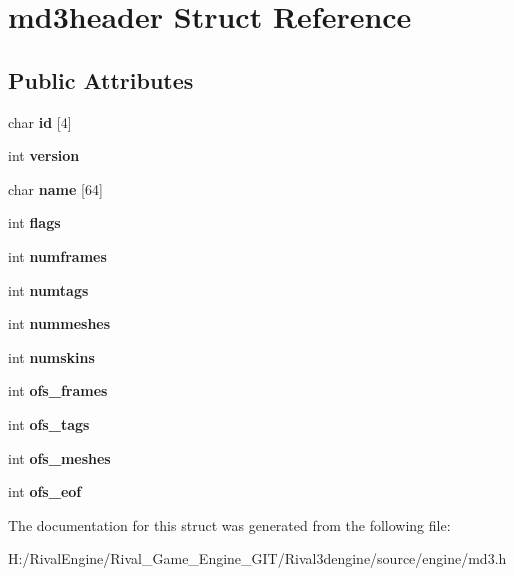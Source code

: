 \hypertarget{structmd3header}{}\section{md3header Struct Reference}
\label{structmd3header}
\subsection*{Public Attributes}
\begin{DoxyCompactItemize}
\item 
\mbox{\label{structmd3header_a7f7b656a44d60fe17d1a7c9157d897ad}} 
char {\bfseries id} \mbox{[}4\mbox{]}
\item 
\mbox{\label{structmd3header_a11b2e4c1163aafc6b4f04e8c1cf5dbd3}} 
int {\bfseries version}
\item 
\mbox{\label{structmd3header_aac06a34fb8ad48ad4baf39a9604f117f}} 
char {\bfseries name} \mbox{[}64\mbox{]}
\item 
\mbox{\label{structmd3header_a4f0509bf89d513e6ef8313ff4a904265}} 
int {\bfseries flags}
\item 
\mbox{\label{structmd3header_aa8087bf7dcc4042386fc33c22a7b31b4}} 
int {\bfseries numframes}
\item 
\mbox{\label{structmd3header_af7b40ea7a833ae4b2fb5d0eb3c0adc36}} 
int {\bfseries numtags}
\item 
\mbox{\label{structmd3header_a23cf0be7fd600d44c2b7be1105f19268}} 
int {\bfseries nummeshes}
\item 
\mbox{\label{structmd3header_ab334a108e0ee795610f730a7d8c88765}} 
int {\bfseries numskins}
\item 
\mbox{\label{structmd3header_ae44a942758d8b198db80a618221de1d8}} 
int {\bfseries ofs\+\_\+frames}
\item 
\mbox{\label{structmd3header_a00d46859b6bb59731ff186824306f071}} 
int {\bfseries ofs\+\_\+tags}
\item 
\mbox{\label{structmd3header_a9416df220a4612e798e8c4290de1c1d8}} 
int {\bfseries ofs\+\_\+meshes}
\item 
\mbox{\label{structmd3header_af0ee8eaec9d32caa917133888b6b41ef}} 
int {\bfseries ofs\+\_\+eof}
\end{DoxyCompactItemize}


The documentation for this struct was generated from the following file\+:\begin{DoxyCompactItemize}
\item 
H\+:/\+Rival\+Engine/\+Rival\+\_\+\+Game\+\_\+\+Engine\+\_\+\+G\+I\+T/\+Rival3dengine/source/engine/md3.\+h\end{DoxyCompactItemize}
